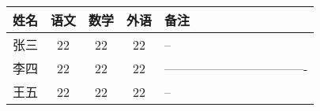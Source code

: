﻿\documentclass{ctexart}
\begin{document}
    \begin{tabular}{|l||c|c|c|p{1.5cm}|}%
        \hline
        姓名 & 语文 & 数学 & 外语 & 备注\\
        \hline \hline
        张三 & 22 & 22 & 22  &--         \\ 
        \hline
        李四 & 22 & 22 & 22  &----------------------------------  \\
        \hline
        王五 & 22 & 22 & 22  &--      \\
        \hline 
    \end{tabular}
\end{document}
